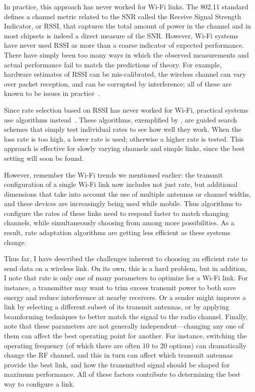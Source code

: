 In practice, this approach has never worked for Wi-Fi links. The 802.11 standard defines a channel metric related to the SNR called the Receive Signal Strength Indicator, or RSSI, that captures the total amount of power in the channel and in most chipsets is indeed a direct measure of the SNR. However, Wi-Fi systems have never used RSSI as more than a coarse indicator of expected performance. There have simply been too many ways in which the observed measurements and actual performance fail to match the predictions of theory. For example, hardware estimates of RSSI can be mis-calibrated, the wireless channel can vary over packet reception, and can be corrupted by interference; all of these are known to be issues in practice~\cite{Camp_rateadapt,Judd_CHARM,Reis_interference}.

Since rate selection based on RSSI has never worked for Wi-Fi, practical systems use  algorithms instead~\cite{Bicket_SampleRate,Minstrel,Wong_RRAA}. These algorithms, exemplified by , are guided search schemes that simply test individual rates to see how well they work. When the loss rate is too high, a lower rate is used; otherwise a higher rate is tested. This approach is effective for slowly varying channels and simple links, since the best setting will soon be found.

However, remember the Wi-Fi trends we mentioned earlier: the transmit configuration of a single Wi-Fi link now includes not just rate, but additional dimensions that take into account the use of multiple antennas or channel widths, and these devices are increasingly being used while mobile. Thus algorithms to configure the rates of these links need to respond faster to match changing channels, while simultaneously choosing from among more possibilities. As a result, rate adaptation algorithms are getting less efficient as these systems change.

Thus far, I have described the challenges inherent to choosing an efficient rate to send data on a wireless link. On its own, this is a hard problem, but in addition, I note that rate is only one of many parameters to optimize for a Wi-Fi link. For instance, a transmitter may want to trim excess transmit power to both save energy and reduce interference at nearby receivers. Or a sender might improve a link by selecting a different subset of its transmit antennas, or by applying beamforming techniques to better match the signal to the radio channel. Finally, note that these parameters are not generally independent---changing any one of them can affect the best operating point for another. For instance, switching the operating frequency (of which there are often 10 to 20 options) can dramatically change the RF channel, and this in turn can affect which transmit antennas provide the best link, and how the transmitted signal should be shaped for maximum performance. All of these factors contribute to determining the best way to configure a link.

